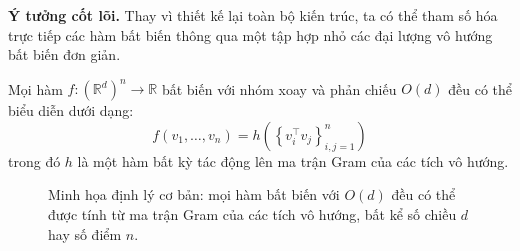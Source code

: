 \textbf{Ý tưởng cốt lõi.} Thay vì thiết kế lại toàn bộ kiến trúc, ta có thể tham số hóa trực tiếp các hàm bất biến thông qua một tập hợp nhỏ các đại lượng vô hướng bất biến đơn giản.

\begin{theorem}
Mọi hàm $f: (\mathbb{R}^d)^n \to \mathbb{R}$ bất biến với nhóm xoay và phản chiếu $O(d)$ đều có thể biểu diễn dưới dạng:
\begin{equation}
    f(v_1, \ldots, v_n) = h\!\left(\left\{v_i^\top v_j\right\}_{i,j=1}^{n}\right)
    \label{eq:first-fundamental-Od}
\end{equation}
trong đó $h$ là một hàm bất kỳ tác động lên ma trận Gram của các tích vô hướng.
\end{theorem}

\begin{figure}[H]
\centering
{}
\caption{Minh họa định lý cơ bản: mọi hàm bất biến với $O(d)$ đều có thể được tính từ ma trận Gram của các tích vô hướng, bất kể số chiều $d$ hay số điểm $n$.}
\label{fig:gram-matrix}
\end{figure}

